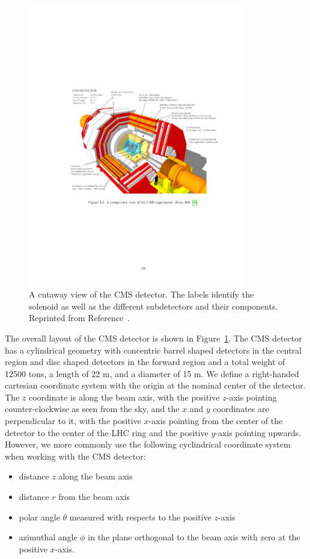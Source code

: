 \begin{figure}[htbp]
  \centering
  \includegraphics[width=0.85\textwidth]{Detector/Figures/cms_detector.pdf}
  \caption{
    A cutaway view of the CMS detector.
    The labels identify the solenoid as well as the different subdetectors and their components. 
    Reprinted from Reference~\cite{CmsWeb}. 
  }
  \label{fig:cms}
\end{figure}

The overall layout of the CMS detector is shown in Figure~\ref{fig:cms}. 
The CMS detector has a cylindrical geometry with concentric barrel shaped detectors in the central region and disc shaped detectors in the forward region and a total weight of 12500 tons, a length of 22 m, and a diameter of 15 m.
We define a right-handed cartesian coordinate system with the origin at the nominal center of the detector.
The $z$ coordinate is along the beam axis, with the positive $z$-axis pointing counter-clockwise as seen from the sky, and the $x$ and $y$ coordinates are perpendicular to it, with the positive $x$-axis pointing from the center of the detector to the center of the LHC ring and the positive $y$-axis pointing upwards.
However, we more commonly use the following cyclindrical coordinate system when working with the CMS detector:
\begin{itemize}
\item distance $z$ along the beam axis
\item distance $r$ from the beam axis
\item polar angle $\theta$ measured with respects to the positive $z$-axis
\item azimuthal angle $\phi$ in the plane orthogonal to the beam axis with zero at the positive $x$-axis.
\end{itemize}

